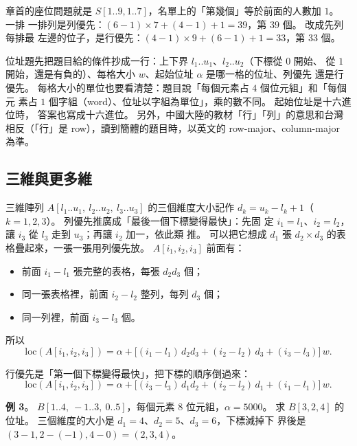 章首的座位問題就是 $S[1..9, 1..7]$，名單上的「第幾個」等於前面的人數加 $1$。 一排
一排列是列優先：$(6 - 1) \times 7 + (4 - 1) + 1 = 39$，第 $39$ 個。 改成先列每排最
左邊的位子，是行優先：$(4 - 1) \times 9 + (6 - 1) + 1 = 33$，第 $33$ 個。

\begin{examnote}
位址題先把題目給的條件抄成一行：上下界 $l_1..u_1$、$l_2..u_2$（下標從 $0$ 開始、
從 $1$ 開始，還是有負的）、每格大小 $w$、起始位址 $\alpha$ 是哪一格的位址、列優先
還是行優先。 每格大小的單位也要看清楚：題目說「每個元素占 $4$ 個位元組」和「每個元
素占 $1$ 個字組（word）、位址以字組為單位」，乘的數不同。 起始位址是十六進位時，
答案也寫成十六進位。 另外，中國大陸的教材「行」「列」的意思和台灣相反（「行」是
row），讀到簡體的題目時，以英文的 row-major、column-major 為準。
\end{examnote}

\subsection{三維與更多維}

三維陣列 $A[l_1..u_1,\ l_2..u_2,\ l_3..u_3]$ 的三個維度大小記作
$d_k = u_k - l_k + 1$（$k = 1, 2, 3$）。 列優先推廣成「最後一個下標變得最快」：先固
定 $i_1 = l_1$、$i_2 = l_2$，讓 $i_3$ 從 $l_3$ 走到 $u_3$；再讓 $i_2$ 加一，依此類
推。 可以把它想成 $d_1$ 張 $d_2 \times d_3$ 的表格疊起來，一張一張用列優先放。
$A[i_1, i_2, i_3]$ 前面有：

\begin{itemize}
\item 前面 $i_1 - l_1$ 張完整的表格，每張 $d_2 d_3$ 個；
\item 同一張表格裡，前面 $i_2 - l_2$ 整列，每列 $d_3$ 個；
\item 同一列裡，前面 $i_3 - l_3$ 個。
\end{itemize}

所以
\begin{equation}
\mathrm{loc}(A[i_1, i_2, i_3]) = \alpha + \bigl[(i_1 - l_1)\,d_2 d_3 + (i_2 - l_2)\,d_3
+ (i_3 - l_3)\bigr]\,w .
\label{eq:arr-3d-row}
\end{equation}

行優先是「第一個下標變得最快」，把下標的順序倒過來：
\begin{equation}
\mathrm{loc}(A[i_1, i_2, i_3]) = \alpha + \bigl[(i_3 - l_3)\,d_1 d_2 + (i_2 - l_2)\,d_1
+ (i_1 - l_1)\bigr]\,w .
\label{eq:arr-3d-col}
\end{equation}

\textbf{例 3}。 $B[1..4,\ -1..3,\ 0..5]$，每個元素 $8$ 位元組，$\alpha = 5000$。 求
$B[3, 2, 4]$ 的位址。 三個維度的大小是 $d_1 = 4$、$d_2 = 5$、$d_3 = 6$，下標減掉下
界後是 $(3 - 1, 2 - (-1), 4 - 0) = (2, 3, 4)$。

